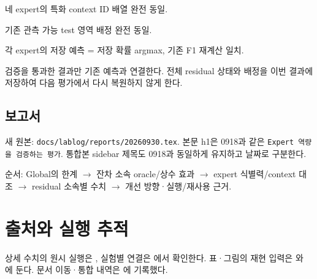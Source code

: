 \par\noindent \textbullet\enspace 네 expert의 특화 context ID 배열 완전 동일.


\par\noindent \textbullet\enspace 기존 관측 가능 test 영역 배정 완전 동일.


\par\noindent \textbullet\enspace 각 expert의 저장 예측 =\allowbreak{} 저장 확률 argmax, 기존 F1 재계산 일치.


검증을 통과한 결과만 기존 예측과 연결한다. 전체 residual 상태와 배정을 이번 결과에 저장하여 다음 평가에서 다시 복원하지 않게 한다.

\subsection{보고서}
새 원본: \texttt{docs/\allowbreak{}\allowbreak{}lab\allowbreak{}log/\allowbreak{}\allowbreak{}repo\allowbreak{}rts/\allowbreak{}\allowbreak{}2026\allowbreak{}0930.\allowbreak{}tex\allowbreak{}}. 본문 h1은 0918과 같은 \texttt{Expert 역\allowbreak{}량을 검증하는 \allowbreak{}평가}. 통합본 sidebar 제목도 0918과 동일하게 유지하고 날짜로 구분한다.

순서: Global의 한계  \ensuremath{\rightarrow}  잔차 소속 oracle/\allowbreak{}상수 효과  \ensuremath{\rightarrow}  expert 식별력/\allowbreak{}context 대조  \ensuremath{\rightarrow}  residual 소속별 수치  \ensuremath{\rightarrow}  개선 방향·실행/\allowbreak{}재사용 근거.



\section*{출처와 실행 추적}

상세 수치의 원시 실행은 , 실험별 연결은 에서 확인한다. 표·그림의 재현 입력은 와 에 둔다. 문서 이동·통합 내역은 에 기록했다.


